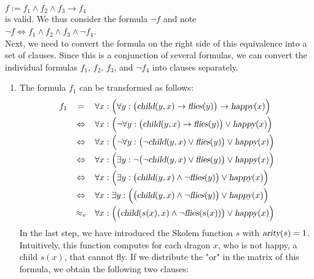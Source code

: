 \hspace*{1.3cm} 
$f := f_1 \wedge f_2 \wedge f_3 \rightarrow f_4$ 
\\[0.2cm]
is valid. We thus consider the formula $\neg f$ and note \\[0.2cm]
\hspace*{1.3cm} $\neg f \Leftrightarrow f_1 \wedge f_2 \wedge f_3 \wedge \neg f_4$. \\[0.2cm]
Next, we need to convert the formula on the right side of this equivalence into a set of clauses.
Since this is a conjunction of several formulas, we can convert the individual formulas $f_1$, $f_2$, $f_3$,
and $\neg f_4$ into clauses separately. 
\begin{enumerate}
\item The formula $f_1$ can be transformed as follows:
 $$ 
  \begin{array}{lcl}
    f_1 & =           & \forall x:\Bigl(\forall y: \big(\textsl{child}(y,x)
    \rightarrow \textsl{flies}(y)\big) \rightarrow \textsl{happy}(x) \Bigr) \\[0.2cm]
    &\Leftrightarrow & \forall x: \Bigl(\neg \forall y: \big( \textsl{child}(y,x) \rightarrow \textsl{flies}(y)\big) \vee \textsl{happy}(x) \Bigr)\\[0.2cm]
    &\Leftrightarrow & \forall x: \Bigl(\neg \forall y: \big( \neg \textsl{child}(y,x) \vee \textsl{flies}(y)\big) \vee \textsl{happy}(x) \Bigr)\\[0.2cm]
    &\Leftrightarrow & \forall x: \Bigl(\exists y: \neg \big( \neg \textsl{child}(y,x) \vee \textsl{flies}(y)\big) \vee \textsl{happy}(x) \Bigr)\\[0.2cm]
    &\Leftrightarrow & \forall x: \Bigl( \exists y: \big(\textsl{child}(y,x) \wedge \neg  \textsl{flies}(y)\big) \vee \textsl{happy}(x) \Bigr)\\[0.2cm]
    &\Leftrightarrow & \forall x:  \exists y: \Bigl(\big( \textsl{child}(y,x) \wedge \neg  \textsl{flies}(y)\big) \vee \textsl{happy}(x) \Bigr)\\[0.2cm]
    &\approx_e & \forall x: \Bigl(\big( \textsl{child}(s(x),x) \wedge \neg  \textsl{flies}(s(x))\big) \vee \textsl{happy}(x) \Bigr)\\
  \end{array}
     $$
      In the last step, we have introduced the Skolem function $s$ with 
      $\textsl{arity}(s) = 1$. Intuitively, this function computes for each
      dragon $x$, who is not happy, a child $s(x)$, that cannot fly.
      If we distribute the "or" in the matrix of this formula,
      we obtain the following two clauses:

\end{enumerate}
